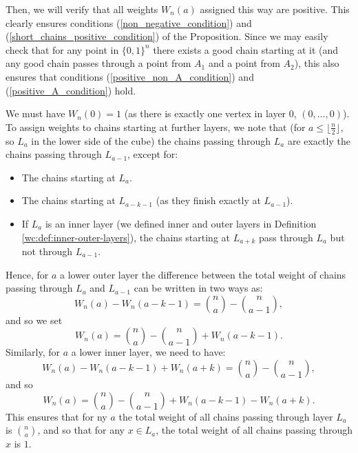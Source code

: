 \documentclass[11pt, reqno]{amsart}
\theoremstyle{remark}
\numberwithin{equation}{section}
\newcommand{\wn}{W_{n}}
\begin{document}
Then, we will verify that all weights $W_n(a)$ assigned this way are positive. This clearly ensures conditions (\ref{non_negative_condition}) and (\ref{short_chains_positive_condition}) of the Proposition. Since we may easily check that for any point in $\{0, 1\}^n$ there exists a good chain starting at it (and any good chain passes through a point from $A_1$ and a point from $A_2$), this also ensures that conditions (\ref{positive_non_A_condition}) and (\ref{positive_A_condition}) hold.

We must have $W_n(0)=1$ (as there is exactly one vertex in layer $0$, $(0, \ldots, 0)$). To assign weights to chains starting at further layers, we note that (for $a \leqslant \big\lfloor \frac{n}{2} \big\rfloor$, so $L_a$ in the lower side of the cube) the chains passing through $L_a$ are exactly the chains passing through $L_{a-1}$, except for:
\begin{itemize}
    \item The chains starting at $L_a$.
    \item The chains starting at $L_{a-k-1}$ (as they finish exactly at $L_{a-1}$).
    \item If $L_a$ is an inner layer (we defined inner and outer layers in Definition \ref{wc:def:inner-outer-layers}), the chains starting at $L_{a+k}$ pass through $L_a$ but not through $L_{a-1}$.
\end{itemize}
Hence, for $a$ a lower outer layer the difference between the total weight of chains passing through $L_a$ and $L_{a-1}$ can be written in two ways as:
\begin{equation*}
    \wn(a) - \wn(a-k-1) = \binom{n}{a} - \binom{n}{a-1},
\end{equation*}
and so we set
\begin{equation}
\label{d1_w_equation_outer}
    W_n(a) = \binom{n}{a} - \binom{n}{a-1} + W_n(a-k-1).
\end{equation}
Similarly, for $a$ a lower inner layer, we need to have:
\begin{equation*}
    \wn(a) - \wn(a-k-1) + \wn(a+k) = \binom{n}{a} - \binom{n}{a-1},
\end{equation*}
and so
\begin{equation}
\label{d1_w_equation_inner}
    W_n(a) = \binom{n}{a} - \binom{n}{a-1} + W_n(a-k-1) - W_n(a+k).
\end{equation}
This ensures that for ny $a$ the total weight of all chains passing through layer $L_a$ is $\binom{n}{a}$, and so that for any $x \in L_a$, the total weight of all chains passing through $x$ is $1$.
\end{document}
